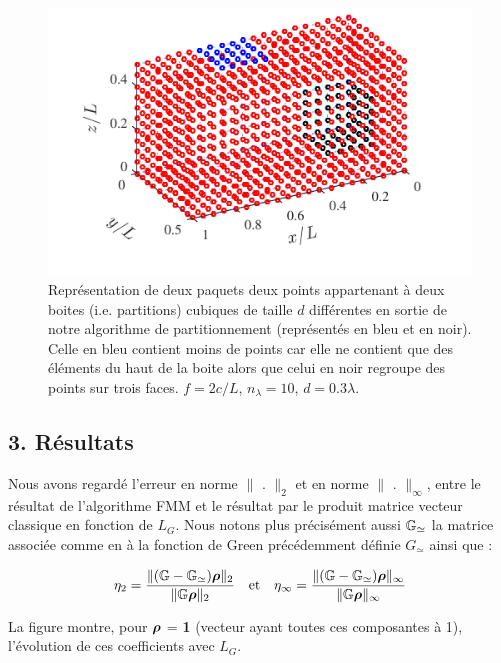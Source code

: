 \documentclass[10pt]{article}
\begin{document}
\begin{multicols}{2}
\begin{figure}[H]
  \begin{center}
  \includegraphics[width=0.95\columnwidth]{Q6.pdf}
  \vspace*{-11pt}
  \caption{Représentation de deux paquets deux points appartenant à deux boites (i.e. partitions) cubiques de taille $d$ différentes en sortie de notre algorithme de partitionnement (représentés en bleu et en noir). Celle en bleu contient moins de points car elle ne contient que des éléments du haut de la boite alors que celui en noir regroupe des points sur trois faces. $f=2c/L$, $n_\lambda = 10$, $d=0.3\lambda$.}
  \label{fig:Q6}
  \end{center}
\end{figure}

\subsection*{3. Résultats}


Nous avons regardé l'erreur en norme $\| \text{ . }\|_{2}$ et en norme $\| \text{ . }\|_{\infty}$, entre le résultat de l'algorithme FMM et le résultat par le produit matrice vecteur classique en fonction de $L_G$. Nous notons plus précisément aussi $\mathbb{G}_{\simeq}$ la matrice associée comme en  à la fonction de Green précédemment définie $G_{\simeq}$ ainsi que : 

\begin{equation}
\eta_{2} = \frac{\| (\mathbb{G} - \mathbb{G}_{\simeq}){\boldsymbol{\rho}} \|_{2}}{\| \mathbb{G}{\boldsymbol{\rho}} \|_{2}} \quad \text{et} \quad 
\eta_{\infty} = \frac{\| (\mathbb{G} - \mathbb{G}_{\simeq}){\boldsymbol{\rho}} \|_{\infty}}{\| \mathbb{G}{\boldsymbol{\rho}} \|_{\infty}} 
\end{equation}

La figure  montre, pour ${\boldsymbol{\rho}}$ = \textbf{1} (vecteur ayant toutes ces composantes à 1), l'évolution de ces coefficients avec $L_G$. \\



\end{multicols}
\end{document}
